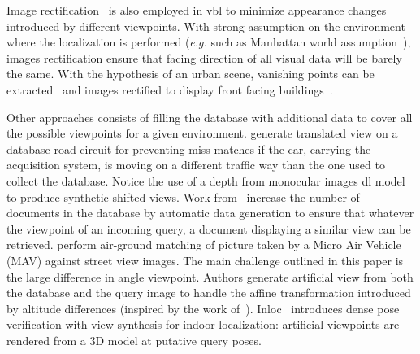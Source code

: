 			Image rectification~\citep{Forstner2016} is also employed in \ac{vbl} to minimize appearance changes introduced by different viewpoints. With strong assumption on the environment where the localization is performed (\textit{e.g.} such as Manhattan world assumption~\citep{Murillo2013,Cham2010}), images rectification ensure that facing direction of all visual data will be barely the same. With the hypothesis of an urban scene, vanishing points can be extracted~\citep{Lezama2014,Hartley2003,Forstner2016} and images rectified to display front facing buildings~\citep{Robertson2004,Chen2011,Morago2016,Arth2015,Cham2010}.
			
			Other approaches consists of filling the database with additional data to cover all the possible viewpoints for a given environment. \citet{Milford2015} generate translated view on a database road-circuit for preventing miss-matches if the car, carrying the acquisition system, is moving on a different traffic way than the one used to collect the database. Notice the use of a depth from monocular images \ac{dl} model to produce synthetic shifted-views. Work from~\citep{Irschara2009,Aubry2014,Torii2015} increase the number of documents in the database by automatic data generation to ensure that whatever the viewpoint of an incoming query, a document displaying a similar view can be retrieved. \citet{Majdik2013} perform air-ground matching of picture taken by a Micro Air Vehicle (MAV) against street view images. The main challenge outlined in this paper is the large difference in angle viewpoint. Authors generate artificial view from both the database and the query image to handle the affine transformation introduced by altitude differences (inspired by the work of~\citep{Morel2009}). Inloc~\citep{Taira2018,Taira2019} introduces dense pose verification with view synthesis for indoor localization: artificial viewpoints are rendered from a 3D model at putative query poses.
			
